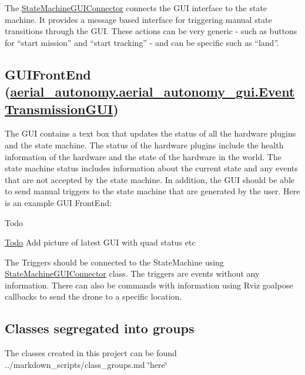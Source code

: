 The \hyperlink{classStateMachineGUIConnector}{State\-Machine\-G\-U\-I\-Connector} connects the G\-U\-I interface to the state machine. It provides a message based interface for triggering manual state transitions through the G\-U\-I. These actions can be very generic -\/ such as buttons for “start mission” and “start tracking” -\/ and can be specific such as “land”.

\subsection*{G\-U\-I\-Front\-End (\hyperlink{classaerial__autonomy_1_1aerial__autonomy__gui_1_1EventTransmissionGUI}{aerial\-\_\-autonomy.\-aerial\-\_\-autonomy\-\_\-gui.\-Event\-Transmission\-G\-U\-I})}

The G\-U\-I contains a text box that updates the status of all the hardware plugins and the state machine. The status of the hardware plugins include the health information of the hardware and the state of the hardware in the world. The state machine status includes information about the current state and any events that are not accepted by the state machine. In addition, the G\-U\-I should be able to send manual triggers to the state machine that are generated by the user. Here is an example G\-U\-I Front\-End\-:

\begin{DoxyRefDesc}{Todo}
\item[\hyperlink{todo__todo000014}{Todo}]Add picture of latest G\-U\-I with quad status etc\end{DoxyRefDesc}


The Triggers should be connected to the {\ttfamily State\-Machine} using {\ttfamily \hyperlink{classStateMachineGUIConnector}{State\-Machine\-G\-U\-I\-Connector}} class. The triggers are events without any information. There can also be commands with information using {\ttfamily Rviz} goalpose callbacks to send the drone to a specific location.

\subsection*{Classes segregated into groups}

The classes created in this project can be found ../markdown\-\_\-scripts/class\-\_\-groups.md \char`\"{}here\char`\"{} 